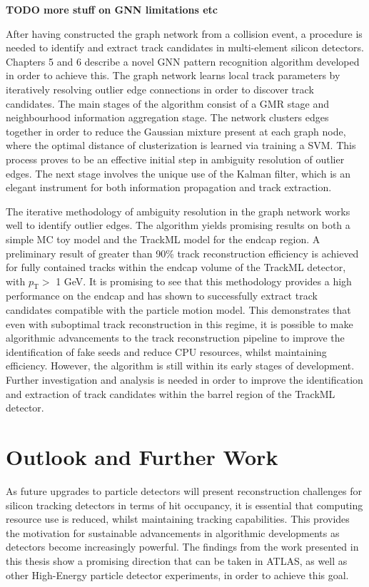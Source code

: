 
\textbf{TODO more stuff on GNN limitations etc}

After having constructed the graph network from a collision event, a procedure is needed to identify and extract track candidates in multi-element silicon detectors. Chapters 5 and 6 describe a novel GNN pattern recognition algorithm developed in order to achieve this. The graph network learns local track parameters by iteratively resolving outlier edge connections in order to discover track candidates. The main stages of the algorithm consist of a GMR stage and neighbourhood information aggregation stage. The network clusters edges together in order to reduce the Gaussian mixture present at each graph node, where the optimal distance of clusterization is learned via training a SVM. This process proves to be an effective initial step in ambiguity resolution of outlier edges. The next stage involves the unique use of the Kalman filter, which is an elegant instrument for both information propagation and track extraction. 

The iterative methodology of ambiguity resolution in the graph network works well to identify outlier edges. The algorithm yields promising results on both a simple MC toy model and the TrackML model for the endcap region. A preliminary result of greater than 90\% track reconstruction efficiency is achieved for fully contained tracks within the endcap volume of the TrackML detector, with $p_{\text{T}} >$ 1 GeV. It is promising to see that this methodology provides a high performance on the endcap and has shown to successfully extract track candidates compatible with the particle motion model. This demonstrates that even with suboptimal track reconstruction in this regime, it is possible to make algorithmic advancements to the track reconstruction pipeline to improve the identification of fake seeds and reduce CPU resources, whilst maintaining efficiency. However, the algorithm is still within its early stages of development. Further investigation and analysis is needed in order to improve the identification and extraction of track candidates within the barrel region of the TrackML detector.


\section{Outlook and Further Work}

As future upgrades to particle detectors will present reconstruction challenges for silicon tracking detectors in terms of hit occupancy, it is essential that computing resource use is reduced, whilst maintaining tracking capabilities. This provides the motivation for sustainable advancements in algorithmic developments as detectors become increasingly powerful. The findings from the work presented in this thesis show a promising direction that can be taken in ATLAS, as well as other High-Energy particle detector experiments, in order to achieve this goal. 
